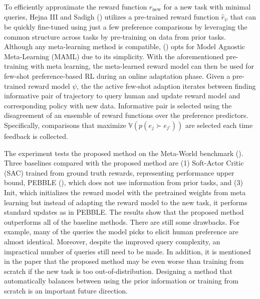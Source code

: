 \documentclass[
  letterpaper,
  numbers=noenddot,
  DIV=11]{scrreprt}
\theoremstyle{plain}
\theoremstyle{definition}
\theoremstyle{remark}
\begin{document}
To efficiently approximate the reward function \(r_\text{new}\) for a
new task with minimal queries, Hejna III and Sadigh
() utilizes a pre-trained reward
function \(\hat{r}_\psi\) that can be quickly fine-tuned using just a
few preference comparisons by leveraging the common structure across
tasks by pre-training on data from prior tasks. Although any
meta-learning method is compatible, () opts for Model Agnostic Meta-Learning (MAML) due
to its simplicity. With the aforementioned pre-training with meta
learning, the meta-learned reward model can then be used for few-shot
preference-based RL during an online adaptation phase. Given a
pre-trained reward model \(\psi\), the the active few-shot adaption
iterates between finding informative pair of trajectory to query human
and update reward model and corresponding policy with new data.
Informative pair is selected using the disagreement of an ensemble of
reward functions over the preference predictors. Specifically,
comparisons that maximize \(\mathbb{V}(p(e_j \succ e_{j'}))\) are
selected each time feedback is collected.

The experiment tests the proposed method on the Meta-World benchmark
(). Three baselines compared
with the proposed method are (1) Soft-Actor Critic (SAC) trained from
ground truth rewards, representing performance upper bound, PEBBLE
(), which does
not use information from prior tasks, and (3) Init, which initializes
the reward model with the pretrained weights from meta learning but
instead of adapting the reward model to the new task, it performs
standard updates as in PEBBLE. The results show that the proposed method
outperforms all of the baseline methods. There are still some drawbacks.
For example, many of the queries the model picks to elicit human
preference are almost identical. Moreover, despite the improved query
complexity, an impractical number of queries still need to be made. In
addition, it is mentioned in the paper that the proposed method may be
even worse than training from scratch if the new task is too
out-of-distribution. Designing a method that automatically balances
between using the prior information or training from scratch is an
important future direction.
\end{document}
